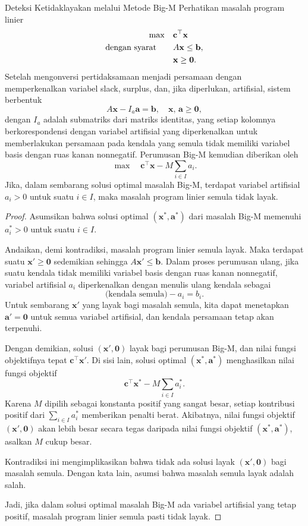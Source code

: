 \begin{theorem}{Deteksi Ketidaklayakan melalui Metode Big-M}{}
Perhatikan masalah program linier
\[
\begin{aligned}
\max\quad & \mathbf{c}^\top \mathbf{x} \\
\mbox{dengan syarat}\quad\quad & A\mathbf{x} \le \mathbf{b}, \\
& \mathbf{x} \ge \mathbf{0}.
\end{aligned}
\]
Setelah mengonversi pertidaksamaan menjadi persamaan dengan memperkenalkan variabel slack, surplus, dan, jika diperlukan, artifisial, sistem berbentuk
\[
A\mathbf{x} - I_a \mathbf{a} = \mathbf{b},\quad \mathbf{x},\, \mathbf{a} \ge \mathbf{0},
\]
dengan \( I_a \) adalah submatriks dari matriks identitas, yang setiap kolomnya berkorespondensi dengan variabel artifisial yang diperkenalkan untuk memberlakukan persamaan pada kendala yang semula tidak memiliki variabel basis dengan ruas kanan nonnegatif. Perumusan Big-M kemudian diberikan oleh
\[
\max\quad \mathbf{c}^\top \mathbf{x} - M\sum_{i\in I} a_i.
\]
Jika, dalam sembarang solusi optimal masalah Big-M, terdapat variabel artifisial \(a_i > 0\) untuk suatu \(i\in I\), maka masalah program linier semula tidak layak.
\end{theorem}

\begin{proof}
Asumsikan bahwa solusi optimal \((\mathbf{x}^*,\mathbf{a}^*)\) dari masalah Big-M memenuhi \(a_i^* > 0\) untuk suatu \(i\in I\).

Andaikan, demi kontradiksi, masalah program linier semula layak. Maka terdapat suatu \(\mathbf{x}'\ge \mathbf{0}\) sedemikian sehingga \(A\mathbf{x}' \le \mathbf{b}\). Dalam proses perumusan ulang, jika suatu kendala tidak memiliki variabel basis dengan ruas kanan nonnegatif, variabel artifisial \(a_i\) diperkenalkan dengan menulis ulang kendala sebagai
\[
\text{(kendala semula)} - a_i = b_i.
\]
Untuk sembarang \(\mathbf{x}'\) yang layak bagi masalah semula, kita dapat menetapkan \(\mathbf{a}' = \mathbf{0}\) untuk semua variabel artifisial, dan kendala persamaan tetap akan terpenuhi.

Dengan demikian, solusi \((\mathbf{x}',\mathbf{0})\) layak bagi perumusan Big-M, dan nilai fungsi objektifnya tepat \(\mathbf{c}^\top \mathbf{x}'\). Di sisi lain, solusi optimal \((\mathbf{x}^*,\mathbf{a}^*)\) menghasilkan nilai fungsi objektif 
\[
\mathbf{c}^\top \mathbf{x}^* - M\sum_{i\in I}a_i^*.
\]
Karena \(M\) dipilih sebagai konstanta positif yang sangat besar, setiap kontribusi positif dari \(\sum_{i\in I}a_i^*\) memberikan penalti berat. Akibatnya, nilai fungsi objektif \((\mathbf{x}',\mathbf{0})\) akan lebih besar secara tegas daripada nilai fungsi objektif \((\mathbf{x}^*,\mathbf{a}^*)\), asalkan \(M\) cukup besar.

Kontradiksi ini mengimplikasikan bahwa tidak ada solusi layak \((\mathbf{x}',\mathbf{0})\) bagi masalah semula. Dengan kata lain, asumsi bahwa masalah semula layak adalah salah.

Jadi, jika dalam solusi optimal masalah Big-M ada variabel artifisial yang tetap positif, masalah program linier semula pasti tidak layak.
\end{proof}

